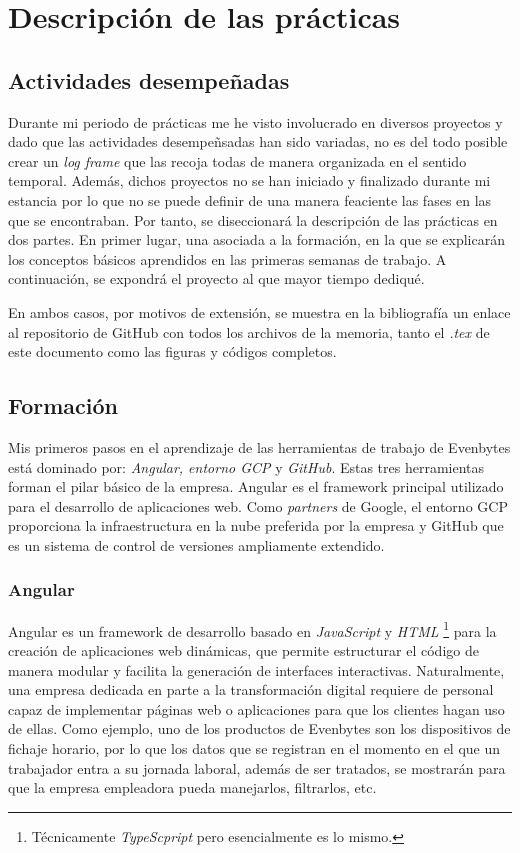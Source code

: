 \chapter{Descripción de las prácticas} \label{descripcion de las practicas}
%
%
\section{Actividades desempeñadas} \label{Actividades desempeñadas}
%
Durante mi periodo de prácticas me he visto involucrado en diversos proyectos y dado que las actividades desempeñsadas han sido variadas, no es del todo posible crear un \textit{log frame} que las recoja todas de manera organizada en el sentido temporal. Además, dichos proyectos no se han iniciado y finalizado durante mi estancia por lo que no se puede definir de una manera feaciente las fases en las que se encontraban. Por tanto, se diseccionará la descripción de las prácticas en dos partes. En primer lugar, una asociada a la formación, en la que se explicarán los conceptos básicos aprendidos en las primeras semanas de trabajo. A continuación, se expondrá el proyecto al que mayor tiempo dediqué.

En ambos casos, por motivos de extensión, se muestra en la bibliografía un enlace al repositorio de GitHub \cite{AlcamsodMemoria} con todos los archivos de la memoria, tanto el \textit{.tex} de este documento como las figuras y códigos completos.
%
%
\section{Formación}
%
%
Mis primeros pasos en el aprendizaje de las herramientas de trabajo de Evenbytes está dominado por: \textit{Angular, entorno GCP} y \textit{GitHub}. Estas tres herramientas forman el pilar básico de la empresa. Angular es el framework principal utilizado para el desarrollo de aplicaciones web. Como \textit{partners} de Google, el entorno GCP proporciona la infraestructura en la nube preferida por la empresa y GitHub que es un sistema de control de versiones ampliamente extendido.
%
%
\subsection{Angular}
%
%
Angular es un framework de desarrollo basado en \textit{JavaScript} y \textit{HTML} \footnote{Técnicamente \textit{TypeScpript} pero esencialmente es lo mismo.} para la creación de aplicaciones web dinámicas, que permite estructurar el código de manera modular y facilita la generación de interfaces interactivas. Naturalmente, una empresa dedicada en parte a la transformación digital requiere de personal capaz de implementar páginas web o aplicaciones para que los clientes hagan uso de ellas. Como ejemplo, uno de los productos de Evenbytes son los dispositivos de fichaje horario, por lo que los datos que se registran en el momento en el que un trabajador entra a su jornada laboral, además de ser tratados, se mostrarán para que la empresa empleadora pueda manejarlos, filtrarlos, etc.


